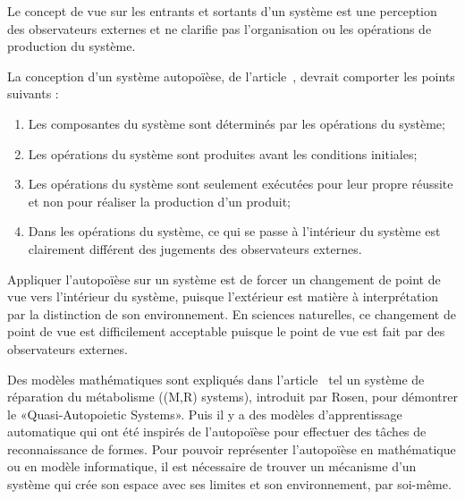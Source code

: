 Le concept de vue sur les entrants et sortants d'un système est une perception des observateurs externes et ne clarifie pas l'organisation ou les opérations de production du système. 



La conception d'un système autopoïèse, de l'article~\cite{tatsuya_computational_autopoiesis_2000}, devrait comporter les points suivants : 

\begin{enumerate}
    \item Les composantes du système sont déterminés par les opérations du système;
    \item Les opérations du système sont produites avant les conditions initiales;
    \item Les opérations du système sont seulement exécutées pour leur propre réussite et non pour réaliser la production d'un produit;
    \item Dans les opérations du système, ce qui se passe à l'intérieur du système est clairement différent des jugements des observateurs externes.
\end{enumerate}



Appliquer l'autopoïèse sur un système est de forcer un changement de point de vue vers l'intérieur du système, puisque l'extérieur est matière à interprétation par la distinction de son environnement. En sciences naturelles, ce changement de point de vue est difficilement acceptable puisque le point de vue est fait par des observateurs externes.

Des modèles mathématiques sont expliqués dans l'article~\cite{tatsuya_computational_autopoiesis_2000} tel un système de réparation du métabolisme ((M,R) systems), introduit par Rosen, pour démontrer le «Quasi-Autopoietic Systems».
Puis il y a des modèles d'apprentissage automatique qui ont été inspirés de l'autopoïèse pour effectuer des tâches de reconnaissance de formes. Pour pouvoir représenter l'autopoïèse en mathématique ou en modèle informatique, il est nécessaire de trouver un mécanisme d'un système qui crée son espace avec ses limites et son environnement, par soi-même.

